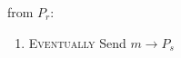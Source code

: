 \begin{bbox}[title={$\mathcal{F}_{smc}(P_r, P_s)$}]

\OnInput {} from $P_r$:
	\begin{enumerate}
		\item \textsc{Eventually} Send $m \rightarrow P_s$
	\end{enumerate}

\end{bbox}
